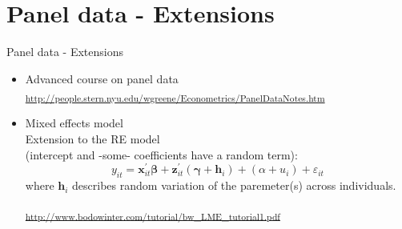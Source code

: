 \documentclass[usenames,dvipsnames]{beamer}
\begin{document}
\section{Panel data - Extensions}
\begin{frame}{Panel data - Extensions}
\begin{itemize}
\item Advanced course on panel data \\
\textsubscript{\textcolor{Blue}{\url{http://people.stern.nyu.edu/wgreene/Econometrics/PanelDataNotes.htm}} }
\bigskip
\item Mixed effects model \\
Extension to the RE model \\(intercept and -some- coefficients have a random term):
$$
y_{it}=\bm{x}_{it}^{\prime} \bm{\beta} + \bm{z}_{it}^{\prime}( \bm{\gamma} + \bm{h}_i) +
(\alpha + u_i) + \varepsilon_{it}
$$
where $\bm{h}_i$ describes random variation of the paremeter(s) across individuals.\\
\medskip

\textsubscript{ \textcolor{Blue}{\url{http://www.bodowinter.com/tutorial/bw_LME_tutorial1.pdf}} } \\
\end{itemize}
\end{frame}
\end{document}
